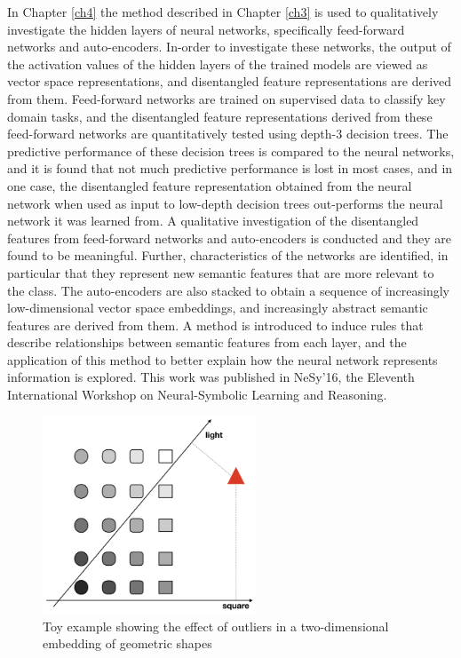 In Chapter \ref{ch4} the method described in Chapter \ref{ch3} is used to qualitatively investigate the hidden layers of neural networks, specifically feed-forward networks and auto-encoders.  In-order to investigate these networks, the output of the activation values of the hidden layers  of the trained models are viewed as vector space representations,  and  disentangled feature representations are derived from them. Feed-forward networks are trained on supervised data to classify key domain tasks, and the disentangled feature representations derived from these feed-forward networks are quantitatively tested using depth-3 decision trees. The predictive performance of these decision trees is compared to the neural networks, and it is found that not much predictive performance is lost in most cases, and in one case, the disentangled feature representation obtained from the neural network when used as input to low-depth decision trees  out-performs the neural network it was learned from. A qualitative investigation of the disentangled features from feed-forward networks and auto-encoders is conducted and they are found to be meaningful. Further, characteristics of the networks are identified, in particular that they represent new semantic features that are more relevant to the class. The auto-encoders are also stacked to obtain a sequence of increasingly low-dimensional vector space embeddings, and increasingly abstract semantic features are derived from them. A method is introduced to induce rules that describe relationships between semantic features from each layer, and the application of this method to  better explain how the neural network represents information is explored. This work was published in NeSy'16, the Eleventh International Workshop on Neural-Symbolic Learning and Reasoning.


\begin{figure}
	\centering
	\includegraphics[width=180pt]{images/shapes}
	\caption{Toy example showing the effect of outliers in a two-dimensional embedding of geometric shapes}
	\label{ch1:toyExample}
\end{figure}



